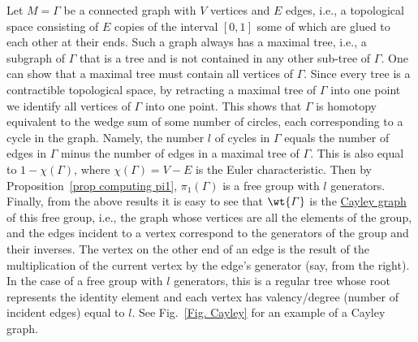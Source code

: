 \begin{example}
    Let $M=\varGamma$ be a connected graph with $V$ vertices and $E$ edges, i.e., a topological space consisting of $E$ copies of the interval $[0,1]$ some of which are glued to each other at their ends. Such a graph always has a maximal tree, i.e., a subgraph of $\varGamma$ that is a tree and is not contained in any other sub-tree of $\varGamma$. One can show that a maximal tree must contain all vertices of $\varGamma$. Since every tree is a contractible topological space, by retracting a maximal tree of $\varGamma$ into one point we identify all vertices of $\varGamma$ into one point. This shows that $\varGamma$ is homotopy equivalent to the wedge sum of some number of circles, each corresponding to a cycle in the graph. Namely, the number $l$ of cycles in $\varGamma$ equals the number of edges in $\varGamma$ minus the number of edges in a maximal tree of $\varGamma$. This is also equal to $1-\chi(\varGamma)$, where $\chi(\varGamma)=V-E$ is the Euler characteristic. Then by Proposition~\ref{prop computing pi1}, $\pi_1(\varGamma)$  is a free group with $l$ generators. Finally, from the above results it is easy to see that $\wt{\varGamma}$ is the \href{https://en.wikipedia.org/wiki/Cayley_graph}{Cayley graph} of this free group, i.e., the graph whose vertices are all the elements of the group, and the edges incident to a vertex correspond to the generators of the group and their inverses. The vertex on the other end of an edge is the result of the multiplication of the current vertex by the edge's generator (say, from the right). In the case of a free group with $l$ generators, this is a regular tree whose root represents the identity element and each vertex has valency/degree (number of incident edges) equal to $l$. See Fig.~\ref{Fig. Cayley} for an example of a Cayley graph.
\end{example}
